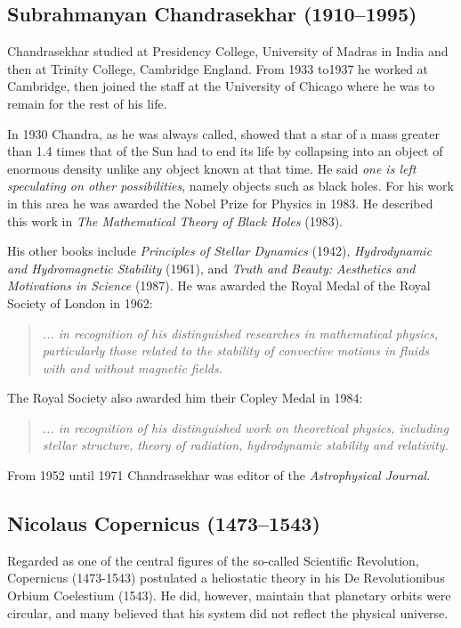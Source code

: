 \subsection[Subrahmanyan \scshape{Chandrasekhar}]{Subrahmanyan Chandrasekhar (1910--1995)}\label{bio:chandra}
Chandrasekhar studied at Presidency College, University of Madras in India and then at Trinity College, Cambridge England. From 1933 to1937 he worked at Cambridge, then joined the staff at the University of Chicago where he was to remain for the rest of his life.

In 1930 Chandra, as he was always called, showed that a star of a mass greater than 1.4 times that of the Sun had to end its life by collapsing into an object of enormous density unlike any object known at that time. He said \textit{one is left speculating on other possibilities}, namely objects such as black holes. For his work in this area he was awarded the Nobel Prize for Physics in 1983. He described this work in \textit{The Mathematical Theory of Black Holes} (1983).

His other books include \textit{Principles of Stellar Dynamics} (1942), \textit{Hydrodynamic and Hydromagnetic Stability} (1961), and \textit{Truth and Beauty: Aesthetics and Motivations in Science} (1987). He was awarded the Royal Medal of the Royal Society of London in 1962:
\begin{quote}
\textit{... in recognition of his distinguished researches in mathematical physics, particularly those related to the stability of convective motions in fluids with and without magnetic fields.}
\end{quote}

The Royal Society also awarded him their Copley Medal in 1984:
\begin{quote}
\textit{... in recognition of his distinguished work on theoretical physics, including stellar structure, theory of radiation, hydrodynamic stability and relativity.}
\end{quote}

From 1952 until 1971 Chandrasekhar was editor of the \textit{Astrophysical Journal}.

\subsection[Nicolaus \scshape{Copernicus}]{Nicolaus Copernicus (1473--1543)}\label{bio:copernicus}
Regarded as one of the central figures of the so-called Scientific Revolution, Copernicus (1473-1543) postulated a heliostatic theory in his De Revolutionibus Orbium Coelestium (1543). He did, however, maintain that planetary orbits were circular, and many believed that his system did not reflect the physical universe.

